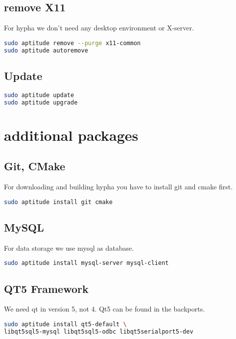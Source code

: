 \documentclass[german,a4paper,11pt]{report}
\begin{document}
\subsection{remove X11}
For hypha we don't need any desktop environment or X-server.
\begin{lstlisting}[language=bash,caption={remove x11}]
sudo aptitude remove --purge x11-common
sudo aptitude autoremove
\end{lstlisting}


\subsection{Update}

\begin{lstlisting}[language=bash,caption={update}]
sudo aptitude update
sudo aptitude upgrade
\end{lstlisting}

\section{additional packages}
\subsection{Git, CMake}
For downloading and building hypha you have to install git and cmake first.

\begin{lstlisting}[language=bash,caption={install git, cmake}]
sudo aptitude install git cmake
\end{lstlisting}

\subsection{MySQL}
For data storage we use mysql as database.

\begin{lstlisting}[language=bash,caption={install mysql}]
sudo aptitude install mysql-server mysql-client
\end{lstlisting}

\subsection{QT5 Framework}
We need qt in version 5, not 4. Qt5 can be found in the backports.
\begin{lstlisting}[language=bash,caption={install qt5}]
sudo aptitude install qt5-default \
libqt5sql5-mysql libqt5sql5-odbc libqt5serialport5-dev
\end{lstlisting}
\end{document}
